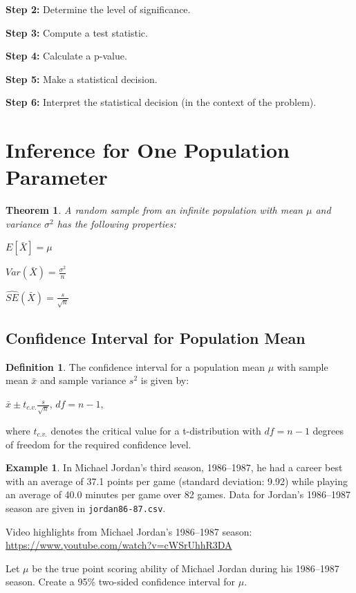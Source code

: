 \documentclass[
  11pt,
]{book}
\newtheorem{theorem}{Theorem}[chapter]
\theoremstyle{definition}
\newtheorem{definition}{Definition}[chapter]
\theoremstyle{definition}
\newtheorem{example}{Example}[chapter]
\theoremstyle{definition}
\theoremstyle{definition}
\theoremstyle{remark}
\begin{document}
\textbf{Step 2:} Determine the level of significance.\\
\vfill

\textbf{Step 3:} Compute a test statistic.\\
\vfill 

\textbf{Step 4:} Calculate a p-value.\\
\vfill

\textbf{Step 5:} Make a statistical decision.\\
\vfill

\textbf{Step 6:} Interpret the statistical decision (in the context of the problem).\\
\vfill

\newpage

\hypertarget{inference-for-one-population-parameter}{%
\section{Inference for One Population Parameter}\label{inference-for-one-population-parameter}}

\begin{theorem}
A random sample from an infinite population with mean \(\mu\) and variance \(\sigma^2\) has the following properties:

\(E[\bar{X}] = \mu\)

\(Var(\bar{X}) = \frac{\sigma^2}{n}\)

\(\hat{SE}(\bar{X}) = \frac{s}{\sqrt{n}}\)
\end{theorem}

\hypertarget{confidence-interval-for-population-mean}{%
\subsection{Confidence Interval for Population Mean}\label{confidence-interval-for-population-mean}}

\begin{definition}
The confidence interval for a population mean \(\mu\) with sample mean \(\bar{x}\) and sample variance \(s^2\) is given by:

\(\bar{x} \pm t_{c.v.}\frac{s}{\sqrt{n}}, \, df=n-1\),

where \(t_{c.v.}\) denotes the critical value for a t-distribution with \(df=n-1\) degrees of freedom for the required confidence level.
\end{definition}

\begin{example}
In Michael Jordan's third season, 1986--1987, he had a career best with an average of 37.1 points per game (standard deviation: 9.92) while playing an average of 40.0 minutes per game over 82 games. Data for Jordan's 1986--1987 season are given in \texttt{jordan86-87.csv}.

Video highlights from Michael Jordan's 1986--1987 season:\\
\url{https://www.youtube.com/watch?v=cWSrUhhR3DA}

Let \(\mu\) be the true point scoring ability of Michael Jordan during his 1986--1987 season. Create a 95\% two-sided confidence interval for \(\mu\).
\end{example}
\end{document}
